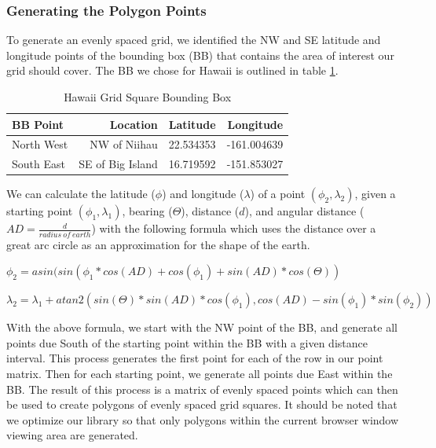 \documentclass[11pt]{article}
\begin{document}
\subsubsection{Generating the Polygon Points}
To generate an evenly spaced grid, we identified the NW and SE latitude and longitude points of the bounding box (BB) that contains the area of interest our grid should cover. The BB we chose for Hawaii is outlined in table \ref{tab:bb_hawaii}.

\begin{table}[htbp]
	\caption{Hawaii Grid Square Bounding Box}
	\label{tab:bb_hawaii}
	\begin{center}
		\begin{tabular}{|l|r|r|r|}
			\hline
			\textbf{BB Point} & \textbf{ Location} & \textbf{Latitude} & \textbf{Longitude}\\
			\hline
			North West & NW of Niihau & 22.534353 & -161.004639\\
			\hline
			South East & SE of Big Island & 16.719592 & -151.853027\\
			\hline
		\end{tabular} 
	\end{center}
\end{table}

We can calculate the latitude ($\phi$) and longitude ($\lambda$) of a point $(\phi_2, \lambda_2)$, given a starting point $(
\phi_1, \lambda_1)$, bearing ($\Theta$), distance ($d$), and angular distance ($AD=\frac{d}{radius\ of\ earth}$) with the following formula which uses the distance over a great arc circle as an approximation for the shape of the earth.

$\phi_2 = asin(sin(\phi_1 * cos(AD) + cos(\phi_1) + sin(AD) * cos(\Theta))$

$\lambda_2 = \lambda_1 + atan2(sin(\Theta) * sin(AD) * cos(\phi_1), cos(AD) - sin(\phi_1) * sin(\phi_2))$

With the above formula, we start with the NW point of the BB, and generate all points due South of the starting point within the BB with a given distance interval. This process generates the first point for each of the row in our point matrix. Then for each starting point, we generate all points due East within the BB. The result of this process is a matrix of evenly spaced points which can then be used to create polygons of evenly spaced grid squares. It should be noted that we optimize our library so that only polygons within the current browser window viewing area are generated.
\end{document}
